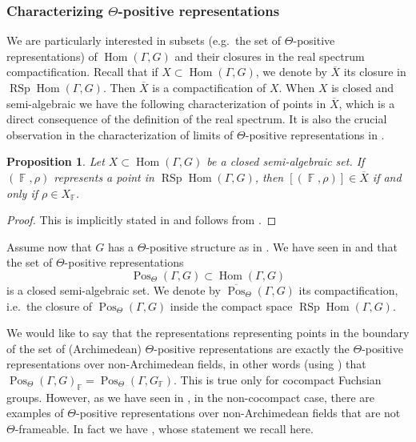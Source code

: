 \documentclass{amsart}
\theoremstyle{plain}
\newtheorem{proposition}{Proposition}[section]
\theoremstyle{definition}
\DeclareMathOperator{\Hom}{Hom}
\DeclareMathOperator{\rsp}{RSp}
\DeclareMathOperator{\RSp}{RSp}
\DeclareMathOperator{\Pos}{Pos}
\DeclareMathOperator{\Fb}{{\mathbb{F}}}
\newcommand{\1}{\mathbf{1}}
\begin{document}
\subsubsection{Characterizing $\Theta$-positive representations}

We are particularly interested in subsets (e.g.\ the set of $\Theta$-positive representations) of $\Hom(\Gamma,G)$ and their closures in the real spectrum compactification. Recall that if $X \subset \Hom(\Gamma,G)$, we denote by $\overline{X}$ its closure in $\RSp\Hom(\Gamma,G)$. Then $\overline{X}$ is a compactification of $X$. When $X$ is closed and semi-algebraic we have the following characterization of points in $\overline{X}$, which is a direct consequence of the definition of the real spectrum. It is also the crucial observation in the characterization of limits of $\Theta$-positive representations in .

\begin{proposition}\label{lem: Characterizing closures of closed semi-algebraic sets}
    Let $X \subset \Hom(\Gamma,G)$ be a closed semi-algebraic set. If $(\Fb,\rho)$ represents a point in $\RSp\Hom(\Gamma,G)$, then $[(\Fb,\rho)] \in \overline{X}$ if and only if $\rho \in X_{\Fb}$.
\end{proposition}

\begin{proof}
    This is implicitly stated in \cite[Remark 2.36]{BurgerIozziParreauPozzetti_RSCCharacterVarieties2} and follows from .
\end{proof}


Assume now that $G$ has a $\Theta$-positive structure as in .
We have seen in  and  that the set of $\Theta$-positive representations 
\[\Pos_\Theta(\Gamma,G) \subset \Hom(\Gamma,G)\]
is a closed semi-algebraic set.
We denote by $\overline{\Pos}_\Theta(\Gamma,G)$ its compactification, i.e.\ the closure of $\Pos_\Theta(\Gamma,G)$ inside the compact space $\rsp\Hom(\Gamma,G)$.

We would like to say that the representations representing points in the boundary of the set of (Archimedean) $\Theta$-positive representations are exactly the $\Theta$-positive representations over non-Archimedean fields, in other words (using ) that $\Pos_\Theta(\Gamma,G)_{\Fb} = \Pos_\Theta(\Gamma,G_{\Fb})$.
This is true only for cocompact Fuchsian groups. However, as we have seen in , in the non-cocompact case, there are examples of $\Theta$-positive representations over non-Archimedean fields that are not $\Theta$-frameable.
In fact we have , whose statement we recall here.
\end{document}
